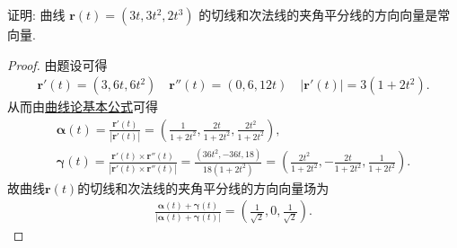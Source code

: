\documentclass[../../main.tex]{subfiles}%
\begin{document}
\begin{example}
证明: 曲线 $\bm{r}(t) = (3t, 3t^2, 2t^3)$ 的切线和次法线的夹角平分线的方向向量是常向量.
\end{example}
\begin{proof}

由题设可得
\begin{align*}
\bm{r}'(t) = \left(3,6t,6t^2\right) \quad \bm{r}''(t) = \left(0,6,12t\right) \quad |\bm{r}'(t)| = 3\left(1+2t^2\right).
\end{align*}
从而由\hyperref[theorem:曲线论基本公式]{曲线论基本公式}可得
\begin{gather*}
\bm{\alpha}(t) = \frac{\bm{r}'(t)}{|\bm{r}'(t)|} = \left( \frac{1}{1+2t^2}, \frac{2t}{1+2t^2}, \frac{2t^2}{1+2t^2} \right), \\
\bm{\gamma}(t) = \frac{\bm{r}'(t) \times \bm{r}''(t)}{|\bm{r}'(t) \times \bm{r}''(t)|} = \frac{\left(36t^2,-36t,18\right)}{18\left(1+2t^2\right)} = \left( \frac{2t^2}{1+2t^2}, -\frac{2t}{1+2t^2}, \frac{1}{1+2t^2} \right).
\end{gather*}
故曲线$\bm{r}(t)$的切线和次法线的夹角平分线的方向向量场为
\begin{align*}
\frac{\boldsymbol{\alpha }\left( t \right) +\boldsymbol{\gamma }\left( t \right)}{\left| \boldsymbol{\alpha }\left( t \right) +\boldsymbol{\gamma }\left( t \right) \right|}=\left( \frac{1}{\sqrt{2}},0,\frac{1}{\sqrt{2}} \right) .
\end{align*}

\end{proof}
\end{document}
